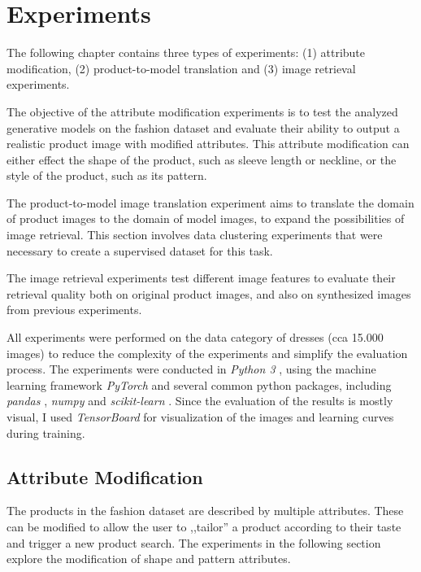 \documentclass[12pt]{report}
\begin{document}
\pagebreak
\chapter{Experiments}
The following chapter contains three types of experiments: (1) attribute modification, (2) product-to-model translation and (3) image retrieval experiments.

The objective of the attribute modification experiments is to test the analyzed generative models on the fashion dataset and evaluate their ability to output a realistic product image with modified attributes. This attribute modification can either effect the shape of the product, such as sleeve length or neckline, or the style of the product, such as its pattern.

The product-to-model image translation experiment aims to translate the domain of product images to the domain of model images, to expand the possibilities of image retrieval. This section involves data clustering experiments that were necessary to create a supervised dataset for this task.

The image retrieval experiments test different image features to evaluate their retrieval quality both on original product images, and also on synthesized images from previous experiments.

All experiments were performed on the data category of dresses (cca 15.000 images) to reduce the complexity of the experiments and simplify the evaluation process. The experiments were conducted in \textit{Python 3} \cite{noauthor_welcome_nodate}, using the machine learning framework \textit{PyTorch} \cite{noauthor_pytorch_nodate} and several common python packages, including \textit{pandas} \cite{noauthor_python_nodate}, \textit{numpy} \cite{noauthor_numpy_nodate} and \textit{scikit-learn} \cite{noauthor_scikit-learn_nodate}. Since the evaluation of the results is mostly visual, I used \textit{TensorBoard} \cite{noauthor_tensorflows_2018} for visualization of the images and learning curves during training.


\pagebreak
\section{Attribute Modification}
The products in the fashion dataset are described by multiple attributes. These can be modified to allow the user to ,,tailor'' a product according to their taste and trigger a new product search. The experiments in the following section explore the modification of shape and pattern attributes.
\end{document}
